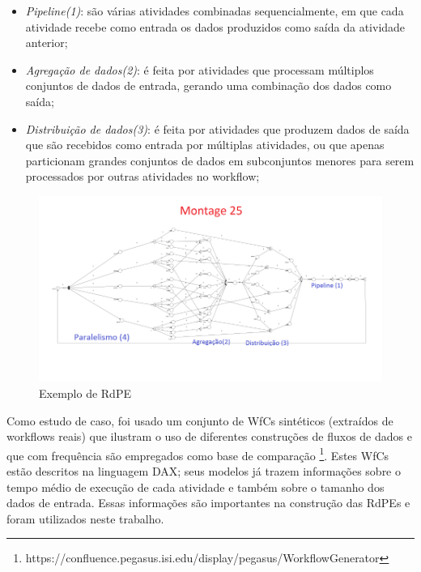 \documentclass[a4paper,10pt]{article}
\begin{document}
	\begin{itemize}
		
		\item \textit{Pipeline(1)}: são várias atividades combinadas sequencialmente, em que cada atividade recebe como entrada os dados produzidos como saída da atividade anterior;
		
		\item \textit{Agregação de dados(2)}: é feita por atividades que processam múltiplos conjuntos de dados de entrada, gerando uma combinação dos dados como saída;

		\item \textit{Distribuição de dados(3)}: é feita por atividades que produzem dados de saída que são recebidos como entrada por múltiplas atividades, ou que apenas particionam grandes conjuntos de dados em subconjuntos menores para serem processados por outras atividades no workflow;

	\end{itemize}

	\begin{figure}[!htb]
		\centering
		\includegraphics{img/montage25_peq}
		\caption{Exemplo de RdPE}
		\label{RdPE_Montage}
	\end{figure}

	Como estudo de caso, foi usado um conjunto de WfCs sintéticos (extraídos de workflows reais) que ilustram o uso de diferentes construções de fluxos de dados e que com frequência são empregados como base de comparação \footnote{https://confluence.pegasus.isi.edu/display/pegasus/WorkflowGenerator}. Estes WfCs estão descritos na linguagem DAX; seus modelos já trazem informações sobre o tempo médio de execução de cada atividade e também sobre o tamanho dos dados de entrada. Essas informações são importantes na construção das RdPEs e foram utilizados neste trabalho.\\
	
\end{document}

